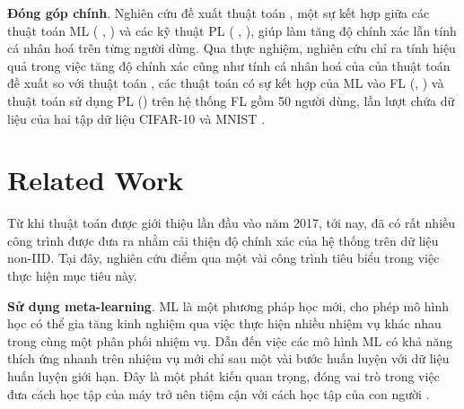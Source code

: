 \documentclass[runningheads]{llncs}
\begin{document}
\textbf{Đóng góp chính}. Nghiên cứu đề xuất thuật toán , một sự kết hợp giữa các thuật toán ML ( \cite{finn2017model},  \cite{li2017meta}) và các kỹ thuật PL ( \cite{arivazhagan2019federated},  \cite{liang2020think}), giúp làm tăng độ chính xác lẫn tính cá nhân hoá trên từng người dùng. Qua thực nghiệm, nghiên cứu chỉ ra tính hiệu quả trong việc tăng độ chính xác cũng như tính cá nhân hoá của của thuật toán đề xuất so với thuật toán , các thuật toán có sự kết hợp của ML vào FL \cite{chen2018federated} (, ) và thuật toán sử dụng PL () trên hệ thống FL gồm 50 người dùng, lần lượt chứa dữ liệu của hai tập dữ liệu CIFAR-10 \cite{krizhevsky2009learning} và MNIST \cite{deng2012mnist}.

\section{Related Work}

Từ khi thuật toán  được giới thiệu lần đầu vào năm 2017, tới nay, đã có rất nhiều công trình được đưa ra nhằm cải thiện độ chính xác của hệ thống trên dữ liệu non-IID. Tại đây, nghiên cứu điểm qua một vài công trình tiêu biểu trong việc thực hiện mục tiêu này.



\textbf{Sử dụng meta-learning}. ML là một phương pháp học mới, cho phép mô hình học có thể gia tăng kinh nghiệm qua việc thực hiện nhiều nhiệm vụ khác nhau trong cùng một phân phối nhiệm vụ. Dẫn đến việc các mô hình ML có khả năng thích ứng nhanh trên nhiệm vụ mới chỉ sau một vài bước huấn luyện với dữ liệu huấn luyện giới hạn. Đây là một phát kiến quan trọng, đóng vai trò trong việc đưa cách học tập của máy trở nên tiệm cận với cách học tập của con người \cite{harlow1949formation}.

\end{document}

